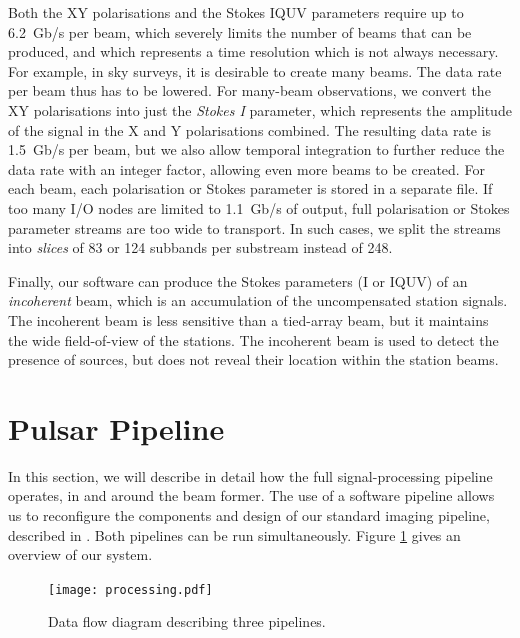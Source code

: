 \documentclass{llncs}
\begin{document}
Both the XY polarisations and the Stokes IQUV parameters require up to 6.2~Gb/s per beam, which severely limits the number of beams that can be produced, and which represents a time resolution which is not always necessary. For example, in sky surveys, it is desirable to create many beams. The data rate per beam thus has to be lowered. For many-beam observations, we convert the XY polarisations into just the \emph{Stokes I} parameter, which represents the amplitude of the signal in the X and Y polarisations combined. The resulting data rate is 1.5~Gb/s per beam, but we also allow temporal integration to further reduce the data rate with an integer factor, allowing even more beams to be created. For each beam, each polarisation or Stokes parameter is stored in a separate file. If too many I/O nodes are limited to 1.1~Gb/s of output, full polarisation or Stokes parameter streams are too wide to transport. In such cases, we split the streams into \emph{slices} of 83 or 124 subbands per substream instead of 248.

Finally, our software can produce the Stokes parameters (I or IQUV) of an \emph{incoherent} beam, which is an accumulation of the uncompensated station signals. The incoherent beam is less sensitive than a tied-array beam, but it maintains the wide field-of-view of the stations. The incoherent beam is used to detect the presence of sources, but does not reveal their location within the station beams.

\section{Pulsar Pipeline}


In this section, we will describe in detail how the full signal-processing pipeline operates, in and around the beam former. The use of a software pipeline allows us to reconfigure the components and design of our standard imaging pipeline, described in \cite{Romein:10a}. Both pipelines can be run simultaneously. Figure \ref{fig:processing} gives an overview of our system.

\begin{figure}[ht]
\center
\texttt{[image: processing.pdf]}
\caption{Data flow diagram describing three pipelines.}
\label{fig:processing}
\end{figure}
\end{document}
